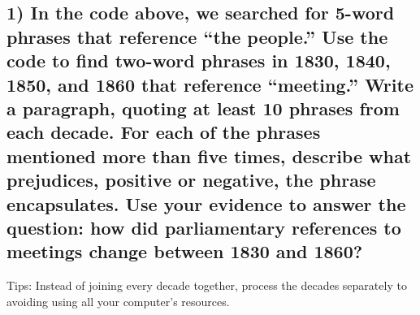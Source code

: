 \documentclass[
]{article}
\begin{document}
\subsection{1) In the code above, we searched for 5-word phrases that
reference ``the people.'' Use the code to find two-word phrases in 1830,
1840, 1850, and 1860 that reference ``meeting.'' Write a paragraph,
quoting at least 10 phrases from each decade. For each of the phrases
mentioned more than five times, describe what prejudices, positive or
negative, the phrase encapsulates. Use your evidence to answer the
question: how did parliamentary references to meetings change between
1830 and
1860?}\label{in-the-code-above-we-searched-for-5-word-phrases-that-reference-the-people.-use-the-code-to-find-two-word-phrases-in-1830-1840-1850-and-1860-that-reference-meeting.-write-a-paragraph-quoting-at-least-10-phrases-from-each-decade.-for-each-of-the-phrases-mentioned-more-than-five-times-describe-what-prejudices-positive-or-negative-the-phrase-encapsulates.-use-your-evidence-to-answer-the-question-how-did-parliamentary-references-to-meetings-change-between-1830-and-1860}

Tips: Instead of joining every decade together, process the decades
separately to avoiding using all your computer's resources.
\end{document}
